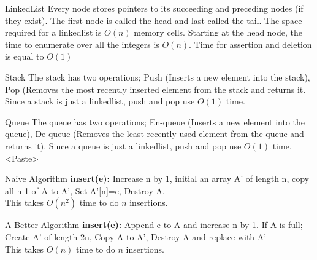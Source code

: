 \documentclass{lecture}
\begin{document}
\begin{landscape}
\begin{multicols}{3}
    \begin{note}{LinkedList}
        Every node stores pointers to its succeeding and preceding nodes (if they exist). The first node is called the head and last called the tail. The space required for a linkedlist is $O(n)$ memory cells. Starting at the head node, the time to enumerate over all the integers is $O(n)$. Time for assertion and deletion is equal to $O(1)$
    \end{note}
    \vfill
    \begin{note}{Stack}
        The stack has two operations; Push (Inserts a new element into the stack), Pop (Removes the most recently inserted element from the stack and returns it. Since a stack is just a linkedlist, push and pop use $O(1)$ time.
    \end{note}
    \vfill
    \begin{note}{Queue}
		The queue has two operations; En-queue (Inserts a new element into the queue), De-queue (Removes the least recently used element from the queue and returns it). Since a queue is just a linkedlist, push and pop use $O(1)$ time.<Paste>
    \end{note}
    \vfill

    \begin{note}{Naive Algorithm}
        \textbf{insert(e):} Increase n by 1, initial an array A' of length n, copy all n-1 of A to A', Set A'[n]=e, Destroy A.\\
        This takes $O(n^2)$ time to do $n$ insertions.
    \end{note}
    \vfill
    \begin{note}{A Better Algorithm}
        \textbf{insert(e):} Append e to A and increase n by 1. If A is full; Create A' of length 2n, Copy A to A', Destroy A and replace with A'\\
        This takes $O(n)$ time to do $n$ insertions.
    \end{note}
    \vfill


\end{multicols}
\end{landscape}
\end{document}
